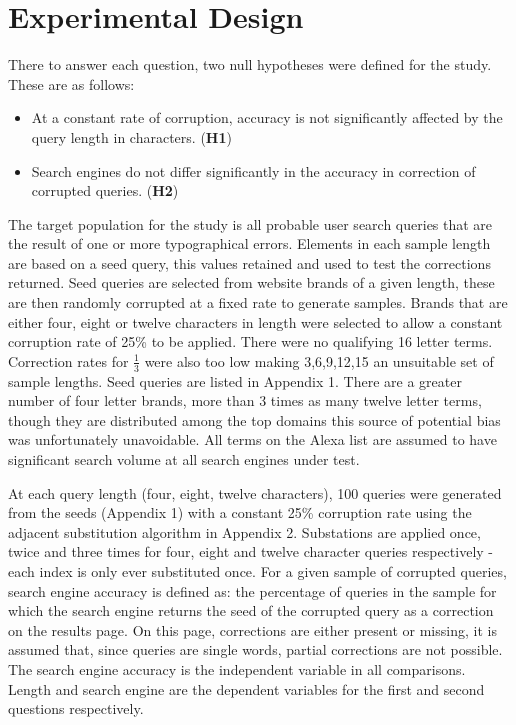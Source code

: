 \documentclass{csfourzero}
\begin{document}
\section{Experimental Design}
\label{sec:exp}

There to answer each question, two null hypotheses were defined for the study. These are as follows:
\begin{itemize}
  \item{At a constant rate of corruption, accuracy is not significantly affected by the query length in characters. (\textbf{H1})}
  \item{Search engines do not differ significantly in the accuracy in correction of corrupted queries. (\textbf{H2})}
\end{itemize}

The target population for the study is all probable user search queries that are the result of one or more typographical errors. Elements in each sample length are based on a seed query, this values retained and used to test the corrections returned. Seed queries are selected from website brands of a given length, these are then randomly corrupted at a fixed rate to generate samples. Brands that are either four, eight or twelve characters in length were selected to allow a constant corruption rate of 25\% to be applied. There were no qualifying 16 letter terms. Correction rates for $\frac{1}{3}$ were also too low making 3,6,9,12,15 an unsuitable set of sample lengths. Seed queries are listed in Appendix 1. There are a greater number of four letter brands, more than 3 times as many twelve letter terms, though they are distributed among the top domains this source of potential bias was unfortunately unavoidable. All terms on the Alexa list are assumed to have significant search volume at all search engines under test.

At each query length (four, eight, twelve characters), 100 queries were generated from the seeds (Appendix 1) with a constant 25\% corruption rate using the adjacent substitution algorithm in Appendix 2. Substations are applied once, twice and three times for four, eight and twelve character queries respectively - each index is only ever substituted once. For a given sample of corrupted queries, search engine accuracy is defined as: the percentage of queries in the sample for which the search engine returns the seed of the corrupted query as a correction on the results page. On this page, corrections are either present or missing, it is assumed that, since queries are single words, partial corrections are not possible. The search engine accuracy is the independent variable in all comparisons. Length and search engine are the dependent variables for the first and second questions respectively.
\end{document}
